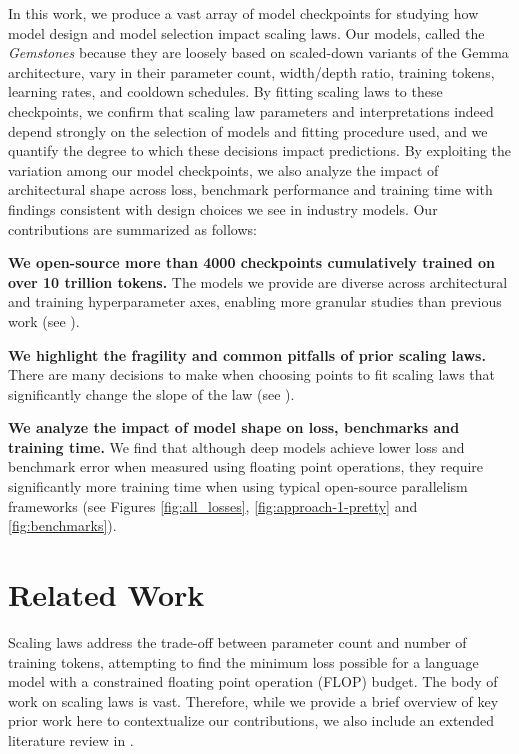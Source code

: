 \documentclass{article}
\begin{document}
In this work, we produce a vast array of model checkpoints for studying how model design and model selection impact scaling laws. Our models, called the {\em Gemstones} because they are loosely based on scaled-down variants of the Gemma architecture, vary in their parameter count, width/depth ratio, training tokens, learning rates, and cooldown schedules.
By fitting scaling laws to these checkpoints, we confirm that scaling law parameters and interpretations indeed depend strongly on the selection of models and fitting procedure used, and we quantify the degree to which these decisions impact predictions.
By exploiting the variation among our model checkpoints, we also analyze the impact of architectural shape across loss, benchmark performance and training time with findings consistent with design choices we see in industry models.
Our contributions are summarized as follows:

\textbf{We open-source more than 4000 checkpoints cumulatively trained on over 10 trillion tokens.}  The models we provide are diverse across architectural and training hyperparameter axes, enabling more granular studies than previous work (see ).

\textbf{We highlight the fragility and common pitfalls of prior scaling laws.} There are many decisions to make when choosing points to fit scaling laws that significantly change the slope of the law (see ).


\textbf{We analyze the impact of model shape on loss, benchmarks and training time.} 
We find that although deep models achieve lower loss and benchmark error when measured using floating point operations, they require significantly more training time when using typical open-source parallelism frameworks (see Figures \ref{fig:all_losses}, \ref{fig:approach-1-pretty} and \ref{fig:benchmarks}).


\section{Related Work}\label{sec:related_work}
Scaling laws address the trade-off between parameter count and number of training tokens, attempting to find the minimum loss possible for a language model with a constrained floating point operation (FLOP) budget. The body of work on scaling laws is vast. Therefore, while we provide a brief overview of key prior work here to contextualize our contributions, we also include an extended literature review in .
\end{document}
